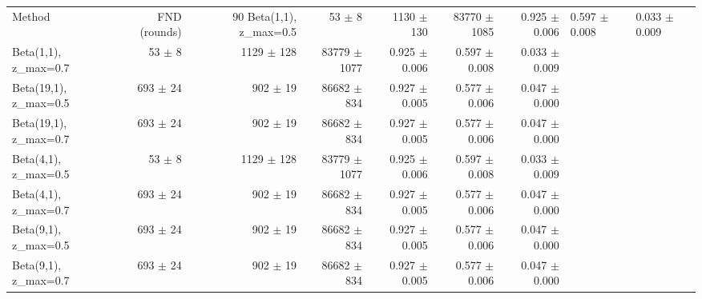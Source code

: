 \begin{tabular}{lrrrrrr}
\toprule
Method & FND (rounds) & 90 %
\midrule
Beta(1,1), z_max=0.5 & 53 $\pm$ 8 & 1130 $\pm$ 130 & 83770 $\pm$ 1085 & 0.925 $\pm$ 0.006 & 0.597 $\pm$ 0.008 & 0.033 $\pm$ 0.009 \\
Beta(1,1), z_max=0.7 & 53 $\pm$ 8 & 1129 $\pm$ 128 & 83779 $\pm$ 1077 & 0.925 $\pm$ 0.006 & 0.597 $\pm$ 0.008 & 0.033 $\pm$ 0.009 \\
Beta(19,1), z_max=0.5 & 693 $\pm$ 24 & 902 $\pm$ 19 & 86682 $\pm$ 834 & 0.927 $\pm$ 0.005 & 0.577 $\pm$ 0.006 & 0.047 $\pm$ 0.000 \\
Beta(19,1), z_max=0.7 & 693 $\pm$ 24 & 902 $\pm$ 19 & 86682 $\pm$ 834 & 0.927 $\pm$ 0.005 & 0.577 $\pm$ 0.006 & 0.047 $\pm$ 0.000 \\
Beta(4,1), z_max=0.5 & 53 $\pm$ 8 & 1129 $\pm$ 128 & 83779 $\pm$ 1077 & 0.925 $\pm$ 0.006 & 0.597 $\pm$ 0.008 & 0.033 $\pm$ 0.009 \\
Beta(4,1), z_max=0.7 & 693 $\pm$ 24 & 902 $\pm$ 19 & 86682 $\pm$ 834 & 0.927 $\pm$ 0.005 & 0.577 $\pm$ 0.006 & 0.047 $\pm$ 0.000 \\
Beta(9,1), z_max=0.5 & 693 $\pm$ 24 & 902 $\pm$ 19 & 86682 $\pm$ 834 & 0.927 $\pm$ 0.005 & 0.577 $\pm$ 0.006 & 0.047 $\pm$ 0.000 \\
Beta(9,1), z_max=0.7 & 693 $\pm$ 24 & 902 $\pm$ 19 & 86682 $\pm$ 834 & 0.927 $\pm$ 0.005 & 0.577 $\pm$ 0.006 & 0.047 $\pm$ 0.000 \\
\bottomrule
\end{tabular}